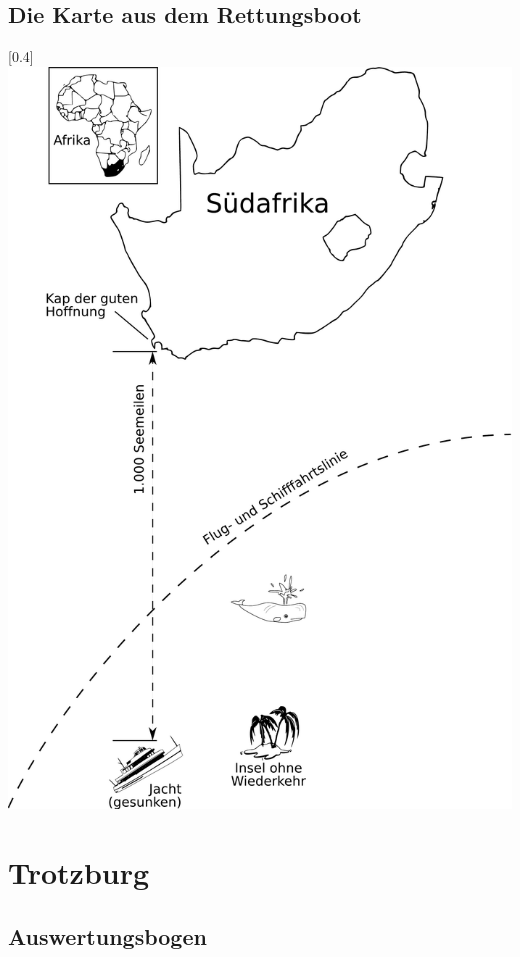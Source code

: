 \section*{Die Karte aus dem Rettungsboot}
\scalebox{0.4}[0.4]{\includegraphics*{insel-ohne-wiederkehr}}
\label{wiederkehr-karte}

\chapter{Trotzburg}
\section*{Auswertungsbogen}
\label{trotzburg-auswertung}
\enlargethispage{1,5cm}
\renewcommand{\arraystretch}{1.27}


